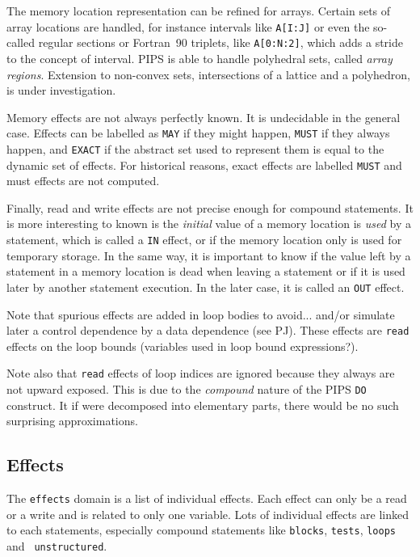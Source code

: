 The memory location representation can be refined for arrays. Certain
sets of array locations are handled, for instance intervals like
\verb/A[I:J]/ or even the so-called regular sections or Fortran~90
triplets, like \verb/A[0:N:2]/, which adds a stride to the concept of
interval. PIPS is able to handle polyhedral sets, called {\em array
regions}. Extension to non-convex sets, intersections of a lattice and a
polyhedron, is under investigation.

Memory effects are not always perfectly known. It is undecidable in the
general case. Effects can be labelled as {\tt MAY} if they might happen,
{\tt MUST} if they always happen, and {\tt EXACT} if the abstract set
used to represent them is equal to the dynamic set of effects. For
historical reasons, exact effects are labelled {\tt MUST} and must
effects are not computed.

Finally, read and write effects are not precise enough for compound
statements. It is more interesting to known is the {\em initial} value
of a memory location is {\em used} by a statement, which is called a
{\tt IN} effect, or if the memory location only is used for temporary
storage. In the same way, it is important to know if the value left by a
statement in a memory location is dead when leaving a statement or if it
is used later by another statement execution. In the later case, it is
called an {\tt OUT} effect.

Note that spurious effects are added in loop bodies to avoid... and/or
simulate later a control dependence by a data dependence (see
PJ).  These effects are \verb/read/ effects on the loop bounds
(variables used in loop bound expressions?). 

Note also that \verb/read/ effects of loop indices are ignored because
they always are not upward exposed. This is due to the {\em compound}
nature of the PIPS \verb/DO/ construct. It if were decomposed into
elementary parts, there would be no such surprising approximations.

\subsection{Effects}
\label{subsection-effects}

The {\tt effects} domain is a list of individual effects. Each effect
can only be a read or a write and is related to only one variable. Lots
of individual effects are linked to each statements, especially compound
statements like {\tt blocks}, {\tt tests}, {\tt loops} and {\tt
unstructured}.

